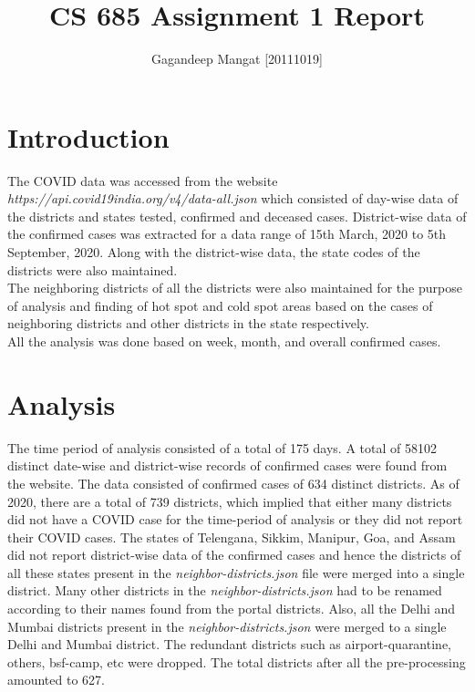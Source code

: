 \documentclass{article}
\title{CS 685 Assignment 1 Report}
\author{Gagandeep Mangat [20111019]}
\begin{document}
\maketitle

\section{Introduction}
The COVID data was accessed from the website \emph{https://api.covid19india.org/v4/data-all.json} which consisted of day-wise data of the districts and states tested, confirmed and deceased cases. District-wise data of the confirmed cases was extracted for a data range of 15th March, 2020 to 5th September, 2020. Along with the district-wise data, the state codes of the districts were also maintained. \\
The neighboring districts of all the districts were also maintained for the purpose of analysis and finding of hot spot and cold spot areas based on the cases of neighboring districts and other districts in the state respectively.\\
All the analysis was done based on week, month, and overall confirmed cases.  

\section{Analysis}
The time period of analysis consisted of a total of 175 days. A total of 58102 distinct date-wise and district-wise records of confirmed cases were found from the website. The data consisted of confirmed cases of 634 distinct districts. As of 2020, there are a total of 739 districts, which implied that either many districts did not have a COVID case for the time-period of analysis or they did not report their COVID cases. The states of Telengana, Sikkim, Manipur, Goa, and Assam did not report district-wise data of the confirmed cases and hence the districts of all these states present in the \emph{neighbor-districts.json} file were merged into a single district. Many other districts in the \emph{neighbor-districts.json} had to be renamed according to their names found from the portal districts. Also, all the Delhi and Mumbai districts present in the \emph{neighbor-districts.json} were merged to a single Delhi and Mumbai district. The redundant districts such as airport-quarantine, others, bsf-camp, etc were dropped. The total districts after all the pre-processing amounted to 627. \\
\end{document}
